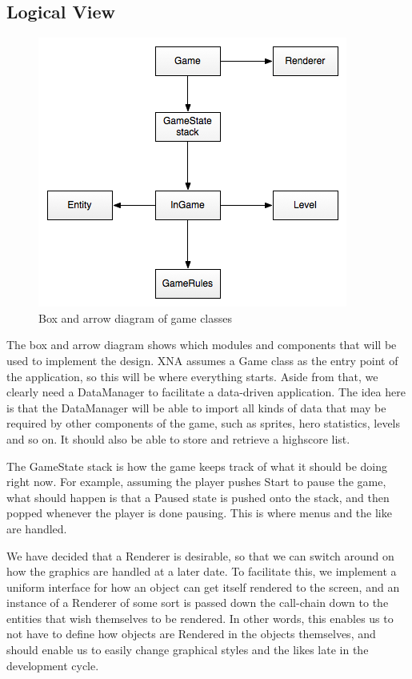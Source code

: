 \subsection{Logical View}

\begin{figure}[H]
	\begin{center}
		\includegraphics[scale=0.75]{graphics/DataManagementView}
	\end{center}
        \caption{Box and arrow diagram of game classes}
\end{figure}

The box and arrow diagram shows which modules and components that will be
used to implement the design. XNA assumes a Game class as the entry point of
the application, so this will be where everything starts. Aside from that,
we clearly need a DataManager to facilitate a data-driven application. The
idea here is that the DataManager will be able to import all kinds of data that
may be required by other components of the game, such as sprites, hero statistics,
levels and so on. It should also be able to store and retrieve a highscore list.

The GameState stack is how the game keeps track of what it should be doing right
now. For example, assuming the player pushes Start to pause the game, what should
happen is that a Paused state is pushed onto the stack, and then popped whenever
the player is done pausing. This is where menus and the like are handled.

We have decided that a Renderer is desirable, so that we can switch around on how
the graphics are handled at a later date. To facilitate this, we implement a
uniform interface for how an object can get itself rendered to the screen, and
an instance of a Renderer of some sort is passed down the call-chain down to the
entities that wish themselves to be rendered. In other words, this enables us to
not have to define how objects are Rendered in the objects themselves, and should
enable us to easily change graphical styles and the likes late in the development
cycle.

